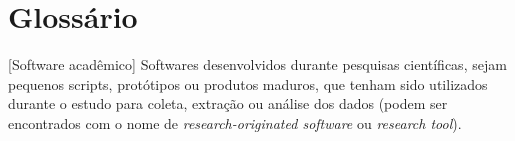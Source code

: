 \chapter*{Glossário}

\begin{acronym}
  [Software acadêmico]{
    Softwares desenvolvidos durante pesquisas científicas, sejam pequenos
    scripts, protótipos ou produtos maduros, que tenham sido utilizados durante
    o estudo para coleta, extração ou análise dos dados (podem ser encontrados
    com o nome de {\it research-originated software} ou {\it research tool}).
  }
\end{acronym}
